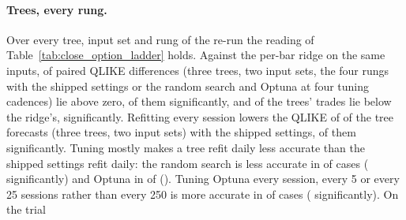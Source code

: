\paragraph{Trees, every rung.} Over every tree, input set and rung
of the re-run the reading of Table~\ref{tab:close_option_ladder} holds. Against
the per-bar ridge on the same inputs, of %
\cmTrVsRidgeN{} paired QLIKE differences (three trees, two input sets, the four
rungs with the shipped settings or the random search and Optuna at four tuning
cadences) \cmTrVsRidgeQAbove{} lie above zero, \cmTrVsRidgeQAboveSig{} of them
significantly, and \cmTrVsRidgeShBelow{} of the trees' trades lie below the ridge's,
\cmTrVsRidgeShBelowSig{} significantly.
Refitting every session lowers the QLIKE of \cmCadQBelow{} of the \cmCadN{} tree forecasts (three %
trees, two input sets) with the shipped settings, \cmCadQBelowSig{} of them
significantly. Tuning mostly makes a tree refit daily less accurate than the shipped
settings refit daily: the random search is less accurate in %
\cmRsQAbove{} of \cmRsN{} cases (\cmRsQAboveSig{} significantly) and Optuna in %
\cmOpQAbove{} of \cmOpN{} (\cmOpQAboveSig{}). Tuning
Optuna every session, every 5 or every 25 sessions
rather than every 250 is more accurate in %
\cmTpQBelow{} of \cmTpN{} cases (\cmTpQBelowSig{} significantly). On the trial
